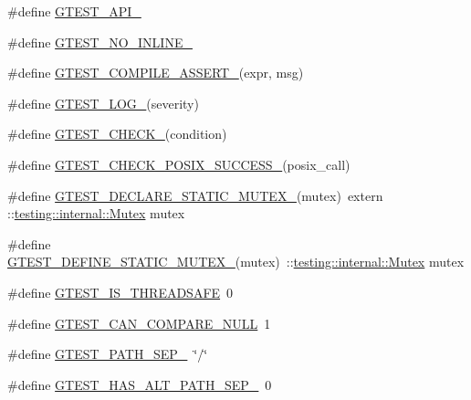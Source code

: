 \begin{DoxyCompactItemize}
\item 
\#define \hyperlink{fused-src_2gtest_2gtest_8h_aa73be6f0ba4a7456180a94904ce17790}{\-G\-T\-E\-S\-T\-\_\-\-A\-P\-I\-\_\-}
\item 
\#define \hyperlink{fused-src_2gtest_2gtest_8h_a9945cbd967fbccb15f8de711f58955c7}{\-G\-T\-E\-S\-T\-\_\-\-N\-O\-\_\-\-I\-N\-L\-I\-N\-E\-\_\-}
\item 
\#define \hyperlink{fused-src_2gtest_2gtest_8h_ae1f37dc71d5daa6fb49ca1b6047d4a8c}{\-G\-T\-E\-S\-T\-\_\-\-C\-O\-M\-P\-I\-L\-E\-\_\-\-A\-S\-S\-E\-R\-T\-\_\-}(expr, msg)
\item 
\#define \hyperlink{fused-src_2gtest_2gtest_8h_a8ef4cb4c465db8c15464aecc6d9510ef}{\-G\-T\-E\-S\-T\-\_\-\-L\-O\-G\-\_\-}(severity)
\item 
\#define \hyperlink{fused-src_2gtest_2gtest_8h_ab54343f0a36dc4cb0ce8a478dd7847b8}{\-G\-T\-E\-S\-T\-\_\-\-C\-H\-E\-C\-K\-\_\-}(condition)
\item 
\#define \hyperlink{fused-src_2gtest_2gtest_8h_a38f6151210e363ad7c69a836b13cf0af}{\-G\-T\-E\-S\-T\-\_\-\-C\-H\-E\-C\-K\-\_\-\-P\-O\-S\-I\-X\-\_\-\-S\-U\-C\-C\-E\-S\-S\-\_\-}(posix\-\_\-call)
\item 
\#define \hyperlink{fused-src_2gtest_2gtest_8h_af0970cdea09f16dbb1dbfccdaa693eeb}{\-G\-T\-E\-S\-T\-\_\-\-D\-E\-C\-L\-A\-R\-E\-\_\-\-S\-T\-A\-T\-I\-C\-\_\-\-M\-U\-T\-E\-X\-\_\-}(mutex)~extern \-::\hyperlink{classtesting_1_1internal_1_1Mutex}{testing\-::internal\-::\-Mutex} mutex
\item 
\#define \hyperlink{fused-src_2gtest_2gtest_8h_a85d5cd679fdbe87383e7dfd1c6651eaa}{\-G\-T\-E\-S\-T\-\_\-\-D\-E\-F\-I\-N\-E\-\_\-\-S\-T\-A\-T\-I\-C\-\_\-\-M\-U\-T\-E\-X\-\_\-}(mutex)~\-::\hyperlink{classtesting_1_1internal_1_1Mutex}{testing\-::internal\-::\-Mutex} mutex
\item 
\#define \hyperlink{fused-src_2gtest_2gtest_8h_a727149862f53b2fb21f6d33cd9323886}{\-G\-T\-E\-S\-T\-\_\-\-I\-S\-\_\-\-T\-H\-R\-E\-A\-D\-S\-A\-F\-E}~0
\item 
\#define \hyperlink{fused-src_2gtest_2gtest_8h_ab8b3af84a03ff5a6d833c109f44c9db4}{\-G\-T\-E\-S\-T\-\_\-\-C\-A\-N\-\_\-\-C\-O\-M\-P\-A\-R\-E\-\_\-\-N\-U\-L\-L}~1
\item 
\#define \hyperlink{fused-src_2gtest_2gtest_8h_afbb636e91bdd50267dbef11a50490b29}{\-G\-T\-E\-S\-T\-\_\-\-P\-A\-T\-H\-\_\-\-S\-E\-P\-\_\-}~\char`\"{}/\char`\"{}
\item 
\#define \hyperlink{fused-src_2gtest_2gtest_8h_acf0ee1851e6d342237bb64806ee1fd27}{\-G\-T\-E\-S\-T\-\_\-\-H\-A\-S\-\_\-\-A\-L\-T\-\_\-\-P\-A\-T\-H\-\_\-\-S\-E\-P\-\_\-}~0

\end{DoxyCompactItemize}
